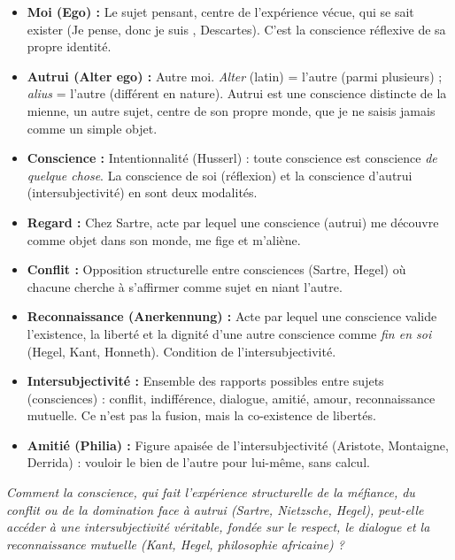\documentclass[11pt]{article}
\newcommand{\cle}[1]{{\popxbold\color{popdark}#1}}
\begin{document}
\begin{definition}
\begin{itemize}
\item \textbf{Moi (Ego) :} Le sujet pensant, centre de l'expérience vécue, qui se sait exister (\guillemotleft Je pense, donc je suis \guillemotright, Descartes). C'est la conscience réflexive de sa propre identité.
\item \textbf{Autrui (Alter ego) :} Autre moi. \emph{Alter} (latin) = \guillemotleft l'autre \guillemotright (parmi plusieurs) ; \emph{alius} = \guillemotleft l'autre \guillemotright (différent en nature). Autrui est une \cle{conscience} distincte de la mienne, un autre sujet, centre de son propre monde, que je ne saisis jamais comme un simple objet.
\item \textbf{Conscience :} Intentionnalité (Husserl) : toute conscience est conscience \emph{de quelque chose}. La conscience de soi (réflexion) et la conscience d'autrui (intersubjectivité) en sont deux modalités.
\item \textbf{Regard :} Chez Sartre, acte par lequel une conscience (autrui) me découvre comme objet dans son monde, me \guillemotleft fige \guillemotright et m'aliène.
\item \textbf{Conflit :} Opposition structurelle entre consciences (Sartre, Hegel) où chacune cherche à s'affirmer comme sujet en niant l'autre.
\item \textbf{Reconnaissance (Anerkennung) :} Acte par lequel une conscience valide l'existence, la liberté et la dignité d'une autre conscience comme \emph{fin en soi} (Hegel, Kant, Honneth). Condition de l'\cle{intersubjectivité}.
\item \textbf{Intersubjectivité :} Ensemble des rapports possibles entre sujets (consciences) : conflit, indifférence, dialogue, amitié, amour, reconnaissance mutuelle. Ce n'est pas la fusion, mais la co-existence de libertés.
\item \textbf{Amitié (Philia) :} Figure apaisée de l'intersubjectivité (Aristote, Montaigne, Derrida) : vouloir le bien de l'autre pour lui-même, sans calcul.
\end{itemize}
\end{definition}

\begin{aretenir}
\emph{Comment la conscience, qui fait l'expérience structurelle de la méfiance, du conflit ou de la domination face à autrui (Sartre, Nietzsche, Hegel), peut-elle accéder à une intersubjectivité véritable, fondée sur le respect, le dialogue et la reconnaissance mutuelle (Kant, Hegel, philosophie africaine) ?}
\end{aretenir}
\end{document}
